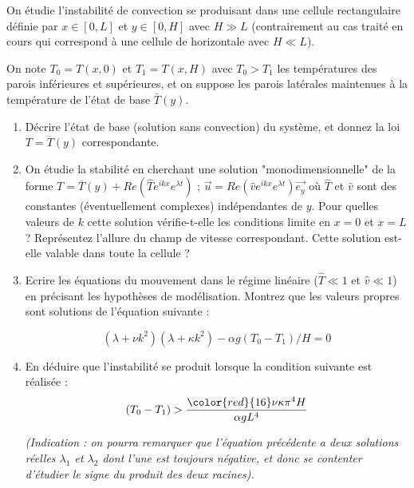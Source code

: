 \documentclass[a4paper,12pt]{article}
\begin{document}
On étudie l'instabilité de convection se produisant dans une cellule rectangulaire définie par 
$x \in [0,L]$ et $y \in [0,H]$ avec $H \gg L$ (contrairement au cas traité en cours qui correspond à une cellule de horizontale avec $ H \ll L$).

On note $T_0 = T(x,0)$ et $T_1 = T(x,H)$ avec  $T_0>T_1$ les températures des parois inférieures et supérieures, et on suppose les parois latérales maintenues à la température de l'état de base $\bar{T}(y)$.

\begin{enumerate}

\item Décrire l'état de base (solution sans convection) du système, et donnez la loi $T = \overline{T}(y)$ correspondante.

\item On étudie la stabilité en cherchant une solution "monodimensionnelle" de la forme 
$T = \overline{T}(y) + Re( \hat{T} e^{i k x} e^{\lambda t})$ ; $\vec{u} = Re(\hat{v} e^{i k x} e^{\lambda t}) \vec{e_y}$ où 
$\hat{T}$ et $\hat{v}$ sont des constantes (éventuellement complexes) indépendantes de $y$. Pour quelles valeurs de $k$ cette solution vérifie-t-elle les conditions limite en $x=0$ et $x=L$ ? Représentez l'allure du champ de vitesse correspondant. Cette solution est-elle valable dans toute la cellule ?

\item Ecrire les équations du mouvement dans le régime linéaire ($\hat{T} \ll1 $ et $\hat{v}\ll1$) en précisant les hypothèses de modélisation. Montrez que les valeurs propres sont solutions de l'équation suivante :

\begin{equation}
(\lambda + \nu k^2) (\lambda + \kappa k^2) - \alpha g (T_0-T_1)/H = 0
\end{equation}

\item 
En déduire que l'instabilité se produit lorsque la condition suivante est réalisée :
\begin{equation}
(T_0-T_1) > \frac{\color{red}{16}\nu \kappa \pi^4 H }{\alpha g L^4} 
\end{equation}
 
 {\em 
 (Indication : on pourra remarquer que l'équation précédente a deux solutions réelles $\lambda_1$ et $\lambda_2$ dont l'une est toujours négative, et donc se contenter d'étudier le signe du produit des deux racines).
 }
 
 
\end{enumerate}
\end{document}
